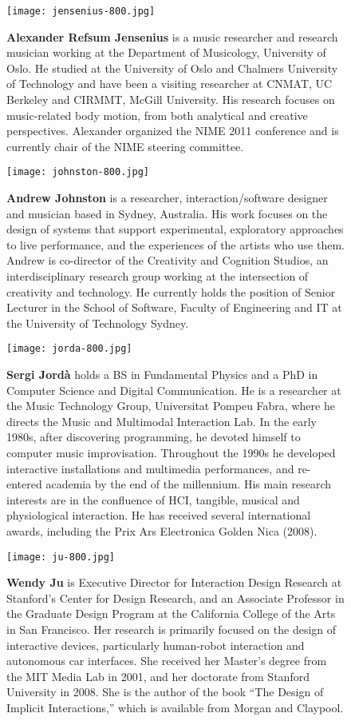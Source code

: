 \begin{authbio}
\begin{figure}[H]
  \sidecaption[t]
  \texttt{[image: jensenius-800.jpg]}
  \caption{\textbf{Alexander Refsum Jensenius} is a music researcher and research musician working at the Department of Musicology, University of Oslo. He studied at the University of Oslo and Chalmers University of Technology and have been a visiting researcher at CNMAT, UC Berkeley and CIRMMT, McGill University. His research focuses on music-related body motion, from both analytical and creative perspectives. Alexander organized the NIME 2011 conference and is currently chair of the NIME steering committee.}
\end{figure}

\begin{figure}[H]
  \sidecaption[t]
  \texttt{[image: johnston-800.jpg]}
  \caption{\textbf{Andrew Johnston} is a researcher, interaction/software designer and musician based in Sydney, Australia. His work focuses on the design of systems that support experimental, exploratory approaches to live performance, and the experiences of the artists who use them. Andrew is co-director of the Creativity and Cognition Studios, an interdisciplinary research group working at the intersection of creativity and technology. He currently holds the position of Senior Lecturer in the School of Software, Faculty of Engineering and IT at the University of Technology Sydney. }
\end{figure}

\begin{figure}[H]
  \sidecaption[t]
  \texttt{[image: jorda-800.jpg]}
  \caption{\textbf{Sergi Jord\`{a}} holds a BS in Fundamental Physics and a PhD in Computer Science and Digital Communication. He is a researcher at the Music Technology Group, Universitat Pompeu Fabra, where he directs the Music and Multimodal Interaction Lab. In the early 1980s, after discovering programming, he devoted himself to computer music improvisation. Throughout the 1990s he developed interactive installations and multimedia performances, and re-entered academia by the end of the millennium. His main research interests are in the confluence of HCI, tangible, musical and physiological interaction. He has received several international awards, including the Prix Ars Electronica Golden Nica (2008).}
\end{figure}

\begin{figure}[H]
  \sidecaption[t]
  \texttt{[image: ju-800.jpg]}
  \caption{\textbf{Wendy Ju} is Executive Director for Interaction Design Research at Stanford's Center for Design Research, and an Associate Professor in the Graduate Design Program at the California College of the Arts in San Francisco. Her research is primarily focused on the design of interactive devices, particularly human-robot interaction and autonomous car interfaces. She received her Master's degree from the MIT Media Lab in 2001, and her doctorate from Stanford University in 2008. She is the author of the book ``The Design of Implicit Interactions,'' which is available from Morgan and Claypool.}
\end{figure}


\end{authbio}
